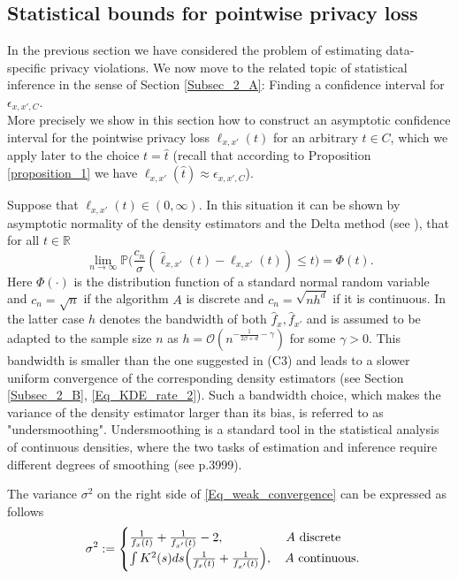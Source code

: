 \documentclass[conference]{IEEEtran}
\begin{document}
\subsection{Statistical bounds for pointwise privacy loss}\label{subsec_42}
In the previous section we have considered the problem of estimating data-specific privacy violations. We now move to the related topic of statistical inference in the sense of Section \ref{Subsec_2_A}: Finding a confidence interval for $\epsilon_{x,x',C}$. \\
More precisely we show in this section how to construct an asymptotic confidence interval for the pointwise privacy loss $\ell_{x,x'}(t)$ for an arbitrary $t \in C$, which we apply later to the choice $t= \hat t$ (recall that according to Proposition \ref{proposition_1} we have  $\ell_{x,x'}(\hat t)\approx \epsilon_{x,x',C}$).

Suppose that $\ell_{x,x'}(t) \in (0,\infty)$. In this situation it can be shown by asymptotic normality of the density estimators and the Delta method (see \cite{vandervaart1998}), that for all $t \in \mathbb{R}$
\begin{equation} \label{Eq_weak_convergence}
  \lim_{n \to \infty} \mathbb{P}\Big( \frac{c_n}{\sigma} (\hat \ell_{x,x'}(t)-\ell_{x,x'}(t)) \le t \Big) = \Phi(t).
\end{equation}
Here $\Phi(\cdot)$ is the distribution function of a standard normal random variable and $c_n= \sqrt{n}$ if the algorithm $A$ is discrete and $c_n=\sqrt{n h^d}$ if it  is continuous. In the latter case $h$ denotes the bandwidth of both $\hat f_x, \hat f_{x'}$ and is assumed to be adapted to the sample size $n$ as $h= \mathcal{O}(n^{-\frac{1}{2\beta+d}-\gamma})$ for some $\gamma>0$. This bandwidth is smaller than the one suggested in (C3) and leads to a slower uniform convergence of the corresponding density estimators (see Section \ref{Subsec_2_B}, \eqref{Eq_KDE_rate_2}). Such a bandwidth choice, which makes the variance of the density estimator larger than its bias, is referred to as "undersmoothing". Undersmoothing is a standard tool in the statistical analysis of continuous densities, where  the two tasks of estimation and inference require different degrees of smoothing (see \cite{Horowitz2001} p.3999). 


The variance $\sigma^2$ on the right side of \eqref{Eq_weak_convergence} can be expressed as follows
$$
\sigma^2 := \begin{cases}
\frac{1}{f_x(t)}+\frac{1}{f_{x'}(t)}-2, \quad\quad\quad\quad\quad A \,\, \textnormal{discrete}
\\
\int K^2(s) ds \Big(\frac{1}{f_x(t)}+\frac{1}{f_{x'}(t)} \Big), \quad A \,\, \textnormal{continuous}.
\end{cases}
$$
\end{document}
